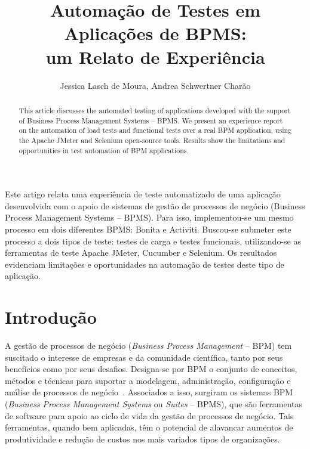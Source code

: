\documentclass[12pt]{article}
\title{Automação de Testes em Aplicações de BPMS:\\ um Relato de Experiência}
\author{Jessica Lasch de Moura\inst{1},
Andrea Schwertner Charão\inst{1}}
\begin{document}
\maketitle

\begin{resumo}
Este artigo relata uma experiência de teste automatizado de uma aplicação desenvolvida com o apoio de sistemas de gestão de processos de negócio (Business Process Management Systems -- BPMS). Para isso, implementou-se um mesmo processo em dois diferentes BPMS: Bonita e Activiti. Buscou-se submeter este processo a dois tipos de teste: testes de carga e testes funcionais, utilizando-se as ferramentas de teste Apache JMeter, Cucumber e Selenium. Os resultados evidenciam limitações e oportunidades na automação de testes deste tipo de aplicação.
\end{resumo}

\begin{abstract}
This article discusses the automated testing of applications developed with the support of Business Process Management Systems -- BPMS. We present an experience report on the automation of load tests and functional tests over a real BPM application, using the Apache JMeter and Selenium open-source tools. Results show the limitations and opportunities in test automation of BPM applications.
\end{abstract}

\section{Introdução}

A gestão de processos de negócio (\emph{Business Process Management} -- BPM) tem suscitado o interesse de empresas e da comunidade científica, tanto por seus benefícios como por seus desafios. Designa-se por BPM o conjunto de conceitos, métodos e técnicas para suportar a modelagem, administração, configuração e análise de processos de negócio~\cite{weske, aalst2013survey}. Associados a isso, surgiram os sistemas BPM (\emph{Business Process Management Systems} ou \emph{Suites} -- BPMS), que são ferramentas de software para apoio ao ciclo de vida da gestão de processos de negócio. Tais ferramentas, quando bem aplicadas, têm o potencial de alavancar aumentos de produtividade e redução de custos nos mais variados tipos de organizações. 
\end{document}
